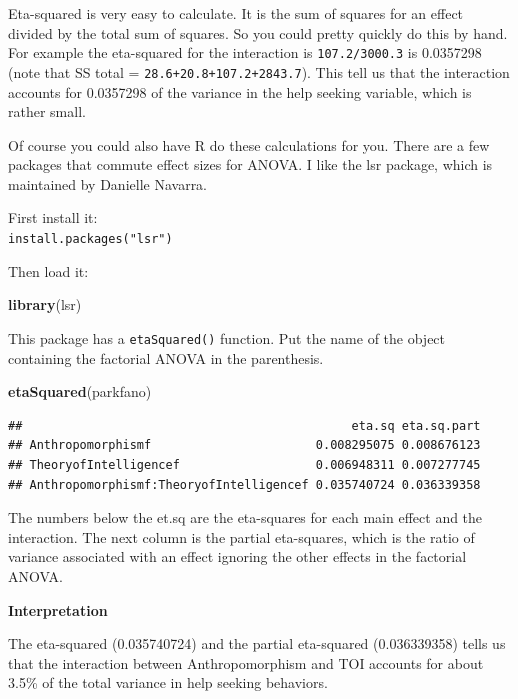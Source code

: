 \documentclass[
]{book}
\newenvironment{Shaded}{\begin{snugshade}}{\end{snugshade}}
\newcommand{\KeywordTok}[1]{\textcolor[rgb]{0.13,0.29,0.53}{\textbf{#1}}}
\newcommand{\NormalTok}[1]{#1}
\begin{document}
Eta-squared is very easy to calculate. It is the sum of squares for an effect divided by the total sum of squares. So you could pretty quickly do this by hand. For example the eta-squared for the interaction is \texttt{107.2/3000.3} is 0.0357298 (note that SS total = \texttt{28.6+20.8+107.2+2843.7}). This tell us that the interaction accounts for 0.0357298 of the variance in the help seeking variable, which is rather small.

Of course you could also have R do these calculations for you. There are a few packages that commute effect sizes for ANOVA. I like the lsr package, which is maintained by Danielle Navarra.

First install it:\\
\texttt{install.packages("lsr")}

Then load it:

\begin{Shaded}
\begin{Highlighting}[]
\KeywordTok{library}\NormalTok{(lsr)}
\end{Highlighting}
\end{Shaded}

This package has a \texttt{etaSquared()} function. Put the name of the object containing the factorial ANOVA in the parenthesis.

\begin{Shaded}
\begin{Highlighting}[]
\KeywordTok{etaSquared}\NormalTok{(parkfano)}
\end{Highlighting}
\end{Shaded}

\begin{verbatim}
##                                              eta.sq eta.sq.part
## Anthropomorphismf                       0.008295075 0.008676123
## TheoryofIntelligencef                   0.006948311 0.007277745
## Anthropomorphismf:TheoryofIntelligencef 0.035740724 0.036339358
\end{verbatim}

The numbers below the et.sq are the eta-squares for each main effect and the interaction. The next column is the partial eta-squares, which is the ratio of variance associated with an effect ignoring the other effects in the factorial ANOVA.

\textbf{Interpretation}

The eta-squared (0.035740724) and the partial eta-squared (0.036339358) tells us that the interaction between Anthropomorphism and TOI accounts for about 3.5\% of the total variance in help seeking behaviors.
\end{document}
